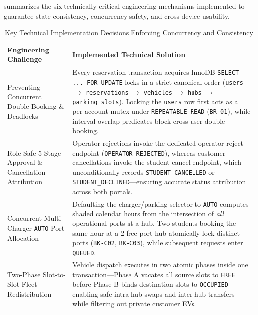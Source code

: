 \label{subsec:impl-decisions}
 summarizes the six technically critical engineering mechanisms implemented to guarantee state consistency, concurrency safety, and cross-device usability.

\begin{table}[H]
  \centering
  \singlespacing\footnotesize
  \caption{Key Technical Implementation Decisions Enforcing Concurrency and Consistency}
  \label{tab:impl-decisions}
  \renewcommand{\arraystretch}{1.24}
  \begin{tabularx}{\textwidth}{|L{3.5cm}|Y|}
    \hline
    \textbf{Engineering Challenge} & \textbf{Implemented Technical Solution} \\
    \hline
    Preventing Concurrent Double-Booking \& Deadlocks & Every reservation transaction acquires InnoDB \texttt{SELECT ... FOR UPDATE} locks in a strict canonical order (\texttt{users} $\rightarrow$ \texttt{reservations} $\rightarrow$ \texttt{vehicles} $\rightarrow$ \texttt{hubs} $\rightarrow$ \texttt{parking\_\allowbreak slots}). Locking the \texttt{users} row first acts as a per-account mutex under \texttt{REPEATABLE READ} (\texttt{BR-01}), while interval overlap predicates block cross-user double-booking. \\
    \hline
    Role-Safe 5-Stage Approval \& Cancellation Attribution & Operator rejections invoke the dedicated operator reject endpoint (\texttt{OPERATOR\_\allowbreak REJECTED}), whereas customer cancellations invoke the student cancel endpoint, which unconditionally records \texttt{STUDENT\_\allowbreak CANCELLED} or \texttt{STUDENT\_\allowbreak DECLINED}---ensuring accurate status attribution across both portals. \\
    \hline
    Concurrent Multi-Charger \texttt{AUTO} Port Allocation & Defaulting the charger/parking selector to \texttt{AUTO} computes shaded calendar hours from the intersection of \emph{all} operational ports at a hub. Two students booking the same hour at a 2-free-port hub atomically lock distinct ports (\texttt{BK-C02}, \texttt{BK-C03}), while subsequent requests enter \texttt{QUEUED}. \\
    \hline
    Two-Phase Slot-to-Slot Fleet Redistribution & Vehicle dispatch executes in two atomic phases inside one transaction---Phase A vacates all source slots to \texttt{FREE} before Phase B binds destination slots to \texttt{OCCUPIED}---enabling safe intra-hub swaps and inter-hub transfers while filtering out private customer EVs. \\

\end{tabularx}
\end{table}
